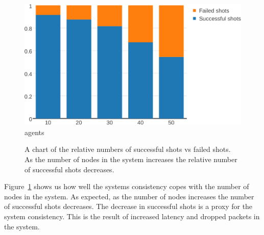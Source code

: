 	\begin{figure}[ht]
	\centering
		\includegraphics[width=0.95\linewidth]{../images/agents-vs-consistency-via-shots-crop.pdf}
		agents
		\caption{\label{figure:nodes-vs-shots-consistency} A chart of the relative numbers of successful shots vs failed shots. As the number of nodes in the system increases the relative number of successful shots decreases.}
	\end{figure}
Figure~\ref{figure:nodes-vs-shots-consistency} shows us how well the systems consistency copes with the number of nodes in the system. As expected, as the number of nodes increases the number of successful shots decreases. The decrease in successful shots is a proxy for the system consistency. 
This is the result of increased latency and dropped packets in the system. 
